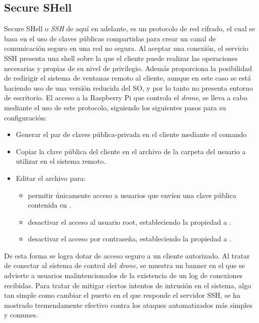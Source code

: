 \subsection{Secure SHell}
\label{subsec:ssh}
Secure SHell o \textit{SSH} \citep{wiki:SSH} de aquí en adelante, es un protocolo de red cifrado, el cual se basa en el uso de claves públicas compartidas para crear un canal de comunicación seguro en una red no segura. Al aceptar una conexión, el servicio SSH presenta una shell sobre la que el cliente puede realizar las operaciones necesarias y propias de su nivel de privilegio. Además proporciona la posibilidad de redirigir el sistema de ventanas remoto al cliente, aunque en este caso se está haciendo uso de una versión reducida del SO, y por lo tanto no presenta entorno de escritorio. El acceso a la Raspberry Pi que controla el \emph{drone}, se lleva a cabo mediante el uso de este protocolo, siguiendo los siguientes pasos para su configuración:
\begin{itemize}
\item Generar el par de claves pública-privada en el cliente mediante el comando 
\item Copiar la clave pública del cliente en el archivo  de la carpeta  del usuario a utilizar en el sistema remoto.
\item Editar el archivo  para:
	\begin{itemize}
	\item permitir únicamente acceso a usuarios que envíen una clave pública contenida en .
	\item desactivar el acceso al usuario root, estableciendo la propiedad  a .
	\item desactivar el acceso por contraseña, estableciendo la propiedad  a .
	\end{itemize}	 
\end{itemize} 

De esta forma se logra dotar de acceso seguro a un cliente autorizado. Al tratar de conectar al sistema de control del \emph{drone}, se muestra un banner en el que se advierte a usuarios malintencionados de la existencia de un log de conexiones recibidas. 
Para tratar de mitigar ciertos intentos de intrusión en el sistema, algo tan simple como cambiar el puerto en el que responde el servidor SSH, se ha mostrado tremendamente efectivo contra los ataques automatizados más simples y comunes.

